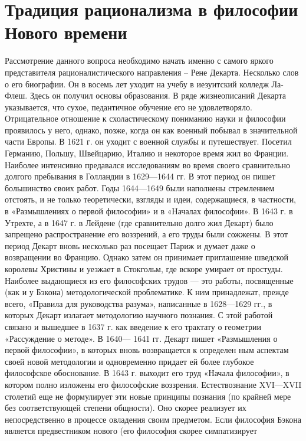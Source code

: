 \documentclass[12pt]{article}
\begin{document}
\section{Традиция рационализма в философии Нового времени}
Рассмотрение данного вопроса необходимо начать именно с самого яркого представителя рационалистического
направления – Рене Декарта. Несколько слов о его биографии. Он в восемь лет уходит на учебу в иезуитский
колледж Ла-Флеш. Здесь он получил основы образования. В ряде жизнеописаний Декарта указывается, что
сухое, педантичное обучение его не удовлетворяло. Отрицательное отношение к схоластическому пониманию
науки и философии проявилось у него, однако, позже, когда он как военный побывал в значительной части
Европы. В 1621 г. он уходит с военной службы и путешествует. Посетил Германию, Польшу, Швейцарию,
Италию и некоторое время жил во Франции. Наиболее интенсивно предавался исследованиям во время своего
сравнительно долгого пребывания в Голландии в 1629—1644 гг. В этот период он пишет большинство своих
работ. Годы 1644—1649 были наполнены стремлением отстоять, и не только теоретически, взгляды и идеи,
содержащиеся, в частности, в «Размышлениях о первой философии» и в «Началах философии». В 1643 г. в
Утрехте, а в 1647 г. в Лейдене (где сравнительно долго жил Декарт) было запрещено распространение его
воззрений, а его труды были сожжены. В этот период Декарт вновь несколько раз посещает Париж и думает
даже о возвращении во Францию. Однако затем он принимает приглашение шведской королевы Христины и
уезжает в Стокгольм, где вскоре умирает от простуды.
Наиболее  выдающиеся  из  его  философских  трудов  —  это  работы,  посвященные  (как  и  у  Бэкона)
методологической  проблематике.  К  ним  принадлежат,  прежде  всего,  «Правила  для  руководства  разума»,
написанные в 1628—1629 гг., в которых Декарт излагает методологию научного познания. С этой работой
связано и вышедшее в 1637 г. как введение к его трактату о геометрии «Рассуждение о методе». В 1640— 1641
гг.  Декарт  пишет  «Размышления  о  первой  философии»,  в  которых  вновь  возвращается  к  определен ным
аспектам своей новой методологии и одновременно придает ей более глубокое философское обоснование. В
1643 г. выходит его труд «Начала философии», в котором полно изложены его философские воззрения.
Естествознание XVI—XVII столетий еще не формулирует эти новые принципы познания (по крайней мере без
соответствующей степени общности). Оно скорее реализует их непосредственно в процессе овладения своим
предметом. Если философия  Бэкона является  предвестником  нового (его  философия скорее  симпатизирует
\end{document}
